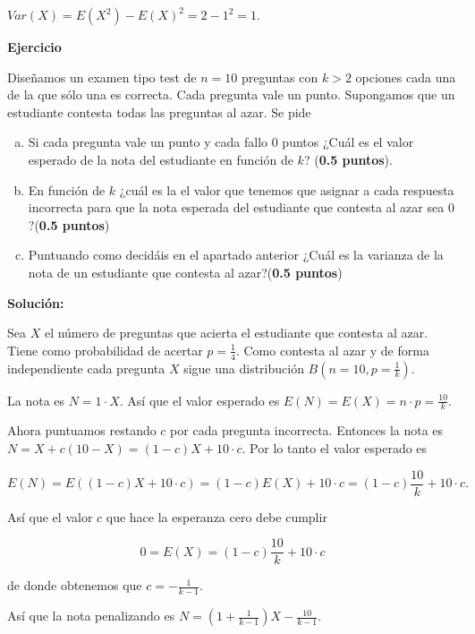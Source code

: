\documentclass[12pt,spanish,es-nodecimaldot]{article}\usepackage[]{graphicx}\usepackage[]{color}
\newcounter{problemes}
\newcounter{punts} \def\thepunts{\arabic{punts}}
\def\probl{\textbf{\newline\noindent\hspace{-1cm} Ejercicio}\addtocounter{problemes}{1} \setcounter{punts}{0}
\medskip\noindent{\bf \theproblemes) }}
\newif\ifsol
\begin{document}
$Var(X)=E(X^2)-E(X)^2=2-1^2=1$.

\fi 

\probl Diseñamos un examen tipo test de $n=10$ preguntas con $k>2$ opciones cada una de la que sólo una es correcta.
Cada pregunta vale un punto. Supongamos que un estudiante contesta todas las preguntas al azar. Se pide

\begin{enumerate}[a)]
\item  Si cada pregunta vale un punto y cada fallo 0 puntos  ¿Cuál es el valor esperado de la nota del estudiante en función de $k$? (\textbf{0.5 puntos}).
\item  En función de $k$ ¿cuál es la el valor que tenemos que asignar a cada respuesta incorrecta para que la nota esperada del estudiante que contesta al azar sea $0$?(\textbf{0.5 puntos}) 
\item  Puntuando como decidáis en el apartado anterior ¿Cuál es la varianza de la nota de un estudiante que contesta al azar?(\textbf{0.5 puntos})

\end{enumerate}


\ifsol

\textbf{Solución:}

Sea $X$ el número de preguntas que acierta el estudiante que contesta al azar. Tiene como probabilidad de acertar $p=\frac{1}{4}$. Como contesta al azar y de forma independiente cada pregunta $X$ sigue una distribución $B(n=10,p=\frac{1}{k})$.

La nota es $N=1\cdot X$. Así que el valor esperado es $E(N)=E(X)=n\cdot p=\frac{10}{k}.$

Ahora puntuamos restando $c$ por cada pregunta incorrecta. Entonces la nota es $N=X+c (10-X)=(1-c) X+10\cdot  c$. 
Por lo tanto el valor esperado es 

$$E(N)=E((1-c) X+10\cdot  c)=(1-c) E(X)+10\cdot c=(1-c)\frac{10}{k}+10\cdot c.$$

Así que  el  valor $c$ que hace la esperanza cero debe cumplir

$$0=E(X)=(1-c)\frac{10}{k}+10\cdot c$$ 

de donde  obtenemos que $c=-\frac{1}{k-1}$.

Así que la nota penalizando es $N=\left(1+\frac{1}{k-1}\right) X-\frac{10}{k-1}.$
\end{document}
